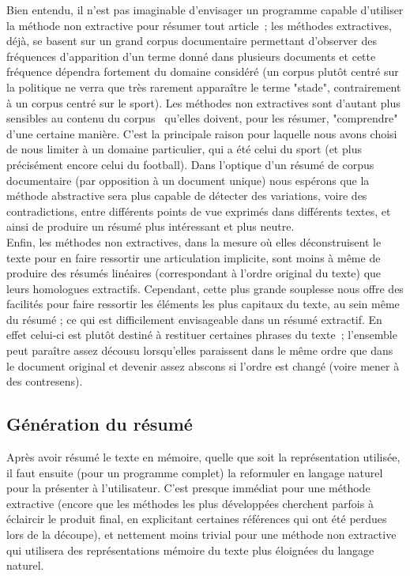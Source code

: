 \documentclass[a4paper, 12pt]{article}
\begin{document}
Bien entendu, il n'est pas imaginable d'envisager un programme capable d'utiliser la méthode non extractive pour résumer tout article~; les méthodes extractives, déjà, se basent sur un grand corpus documentaire permettant d'observer des fréquences d'apparition d'un terme donné dans plusieurs documents et cette fréquence dépendra fortement du domaine considéré (un corpus plutôt centré sur la politique ne verra que très rarement apparaître le terme "stade", contrairement à un corpus centré sur le sport). Les méthodes non extractives sont d'autant plus sensibles au contenu du corpus~\cite[p.1774]{jones_automatic_2007} qu'elles doivent, pour les résumer, "comprendre" d'une certaine manière. C'est la principale raison pour laquelle nous avons choisi de nous limiter à un domaine particulier, qui a été celui du sport (et plus précisément encore celui du football). Dans l'optique d'un résumé de corpus documentaire (par opposition à un document unique) nous espérons que la méthode abstractive sera plus capable de détecter des variations, voire des contradictions, entre différents points de vue exprimés dans différents textes, et ainsi de produire un résumé plus intéressant et plus neutre.\\

Enfin, les méthodes non extractives, dans la mesure où elles déconstruisent le texte pour en faire ressortir une articulation implicite, sont moins à même de produire des résumés linéaires (correspondant à l'ordre original du texte) que leurs homologues extractifs. Cependant, cette plus grande souplesse nous offre des facilités pour faire ressortir les éléments les plus capitaux du texte, au sein même du résumé ; ce qui est difficilement envisageable dans un résumé extractif. En effet celui-ci est plutôt destiné à restituer certaines phrases du texte~; l'ensemble peut paraître assez décousu lorsqu'elles paraissent dans le même ordre que dans le document original et devenir assez abscons si l'ordre est changé (voire mener à des contresens).

\subsection{Génération du résumé}

Après avoir résumé le texte en mémoire, quelle que soit la représentation utilisée, il faut ensuite (pour un programme complet) la reformuler en langage naturel pour la présenter à l'utilisateur. C'est presque immédiat pour une méthode extractive (encore que les méthodes les plus développées cherchent parfois à éclaircir le produit final, en explicitant certaines références qui ont été perdues lors de la découpe), et nettement moins trivial pour une méthode non extractive qui utilisera des représentations mémoire du texte plus éloignées du langage naturel.\\
\end{document}
